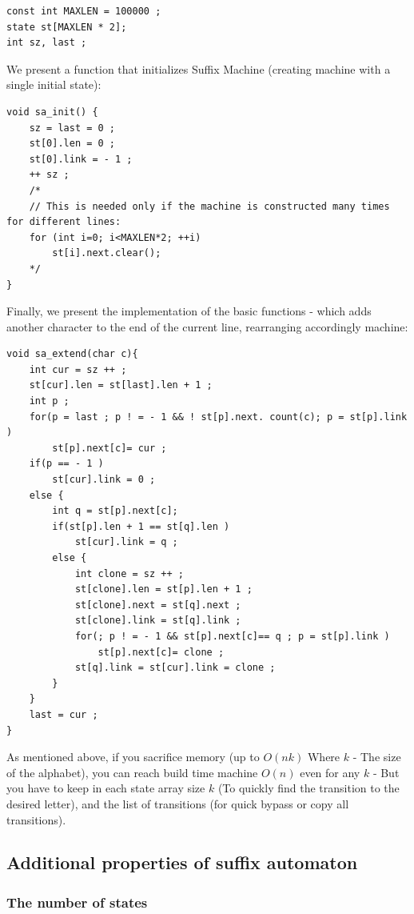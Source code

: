 \begin{verbatim}
const int MAXLEN = 100000 ;
state st[MAXLEN * 2];
int sz, last ; 
\end{verbatim}
We present a function that initializes Suffix Machine (creating machine with a single initial state):

\begin{verbatim}
void sa_init() {
    sz = last = 0 ;
    st[0].len = 0 ;
    st[0].link = - 1 ;
    ++ sz ;
    /*
    // This is needed only if the machine is constructed many times for different lines:
    for (int i=0; i<MAXLEN*2; ++i)
        st[i].next.clear();
    */
} 
\end{verbatim}
Finally, we present the implementation of the basic functions - which adds another character to the end of the current line, rearranging accordingly machine:

\begin{verbatim}
void sa_extend(char c){
    int cur = sz ++ ;
    st[cur].len = st[last].len + 1 ;
    int p ;
    for(p = last ; p ! = - 1 && ! st[p].next. count(c); p = st[p].link )
        st[p].next[c]= cur ;
    if(p == - 1 )
        st[cur].link = 0 ;
    else {
        int q = st[p].next[c];
        if(st[p].len + 1 == st[q].len )
            st[cur].link = q ;
        else {
            int clone = sz ++ ;
            st[clone].len = st[p].len + 1 ;
            st[clone].next = st[q].next ;
            st[clone].link = st[q].link ;
            for(; p ! = - 1 && st[p].next[c]== q ; p = st[p].link )
                st[p].next[c]= clone ;
            st[q].link = st[cur].link = clone ;
        }
    }
    last = cur ;
} 
\end{verbatim}
As mentioned above, if you sacrifice memory (up to $O (n k)$ Where $k$ - The size of the alphabet), you can reach build time machine $O (n)$ even for any $k$ - But you have to keep in each state array size $k$ (To quickly find the transition to the desired letter), and the list of transitions (for quick bypass or copy all transitions).

\subsection{ Additional properties of suffix automaton }

\subsubsection{ The number of states }


